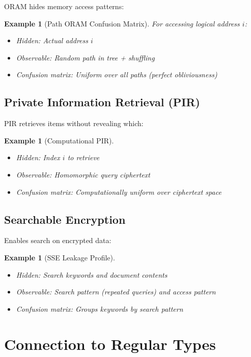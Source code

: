 \documentclass[11pt,final]{article}
\newtheorem{example}[theorem]{Example}
\begin{document}
ORAM hides memory access patterns:

\begin{example}[Path ORAM Confusion Matrix]
For accessing logical address $i$:
\begin{itemize}
\item Hidden: Actual address $i$
\item Observable: Random path in tree + shuffling
\item Confusion matrix: Uniform over all paths (perfect obliviousness)
\end{itemize}
\end{example}

\subsection{Private Information Retrieval (PIR)}

PIR retrieves items without revealing which:

\begin{example}[Computational PIR]
\begin{itemize}
\item Hidden: Index $i$ to retrieve
\item Observable: Homomorphic query ciphertext
\item Confusion matrix: Computationally uniform over ciphertext space
\end{itemize}
\end{example}

\subsection{Searchable Encryption}

Enables search on encrypted data:

\begin{example}[SSE Leakage Profile]
\begin{itemize}
\item Hidden: Search keywords and document contents
\item Observable: Search pattern (repeated queries) and access pattern
\item Confusion matrix: Groups keywords by search pattern
\end{itemize}
\end{example}

\section{Connection to Regular Types}
\end{document}
